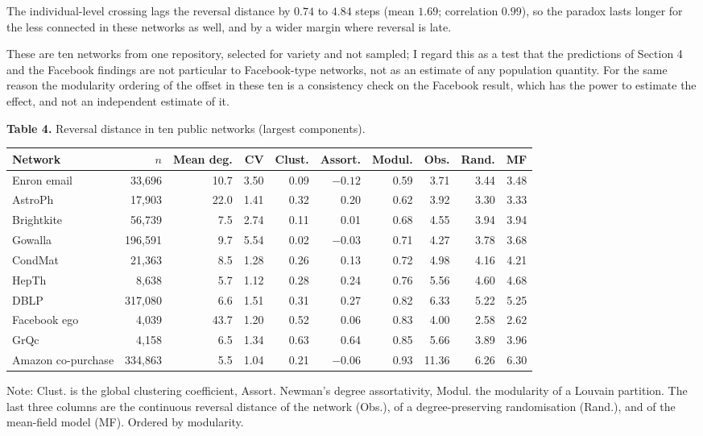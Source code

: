 \documentclass{nws}
\begin{document}
The
individual-level crossing lags the reversal distance by $0.74$ to $4.84$ steps (mean $1.69$;
correlation $0.99$), so the paradox lasts longer for the less connected in these networks
as well, and by a wider margin where reversal is late.

These are ten networks from
one repository, selected for variety and not sampled; I regard this as a test that the
predictions of Section 4 and the Facebook findings are not particular to
Facebook-type networks, not as an estimate of any population quantity. For the same reason the modularity ordering of the offset in these ten is a consistency check on the Facebook result, which has the power to estimate the effect, and not an independent estimate of it.

\begin{table}[t]
\centering
\textbf{Table 4.} Reversal distance in ten public networks (largest components).

\vspace{4pt}
{\footnotesize\sf\sansmath\setlength{\tabcolsep}{3.5pt}
\begin{tabular}{lrrrrrrrrr}
\toprule
Network & $n$ & Mean deg. & CV & Clust. & Assort. & Modul. & Obs. & Rand. & MF\\
\midrule
Enron email & 33{,}696 & 10.7 & 3.50 & 0.09 & $-0.12$ & 0.59 & 3.71 & 3.44 & 3.48\\
AstroPh & 17{,}903 & 22.0 & 1.41 & 0.32 & 0.20 & 0.62 & 3.92 & 3.30 & 3.33\\
Brightkite & 56{,}739 & 7.5 & 2.74 & 0.11 & 0.01 & 0.68 & 4.55 & 3.94 & 3.94\\
Gowalla & 196{,}591 & 9.7 & 5.54 & 0.02 & $-0.03$ & 0.71 & 4.27 & 3.78 & 3.68\\
CondMat & 21{,}363 & 8.5 & 1.28 & 0.26 & 0.13 & 0.72 & 4.98 & 4.16 & 4.21\\
HepTh & 8{,}638 & 5.7 & 1.12 & 0.28 & 0.24 & 0.76 & 5.56 & 4.60 & 4.68\\
DBLP & 317{,}080 & 6.6 & 1.51 & 0.31 & 0.27 & 0.82 & 6.33 & 5.22 & 5.25\\
Facebook ego & 4{,}039 & 43.7 & 1.20 & 0.52 & 0.06 & 0.83 & 4.00 & 2.58 & 2.62\\
GrQc & 4{,}158 & 6.5 & 1.34 & 0.63 & 0.64 & 0.85 & 5.66 & 3.89 & 3.96\\
Amazon co-purchase & 334{,}863 & 5.5 & 1.04 & 0.21 & $-0.06$ & 0.93 & 11.36 & 6.26 & 6.30\\
\bottomrule
\end{tabular}
\par}

\vspace{4pt}
{\small Note: Clust. is the global clustering coefficient, Assort. Newman's degree
assortativity, Modul. the modularity of a Louvain partition. The last three columns are
the continuous reversal distance of the network (Obs.), of a degree-preserving
randomisation (Rand.), and of the mean-field model (MF). Ordered by modularity.}
\end{table}
\end{document}
